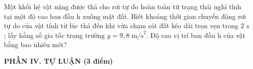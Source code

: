 	\begin{ex}%
		Một khối hệ vật nặng được thả cho rơi tự do hoàn toàn từ trạng thái nghỉ tĩnh tại một độ cao ban đầu h xuống mặt đất. Biết khoảng thời gian chuyển động rơi tự do của vật tính từ lúc thả đến khi vừa chạm sát đất kéo dài trọn vẹn trong $2\text{ s}$; lấy hằng số gia tốc trọng trường $g = 9,8\text{ m/s}^2$. Độ cao vị trí ban đầu h của vật bằng bao nhiêu mét?
	\end{ex}
	
	
	\noindent \textbf{PHẦN IV. TỰ LUẬN (3 điểm)}
	\vspace{0.2cm}
	
